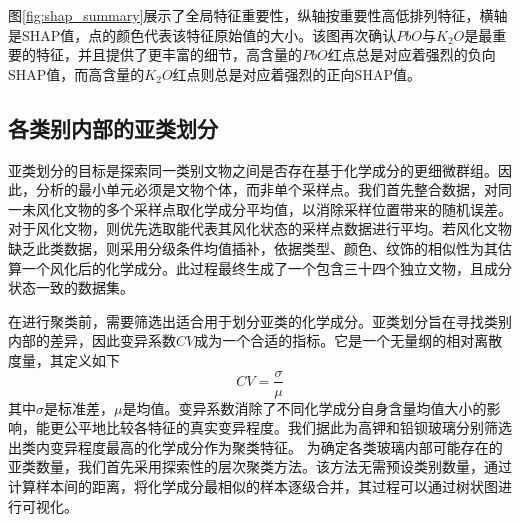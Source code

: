 图\ref{fig:shap_summary}展示了全局特征重要性，纵轴按重要性高低排列特征，横轴是SHAP值，点的颜色代表该特征原始值的大小。该图再次确认$PbO$与$K_2O$是最重要的特征，并且提供了更丰富的细节，高含量的$PbO$红点总是对应着强烈的负向SHAP值，而高含量的$K_2O$红点则总是对应着强烈的正向SHAP值。

\subsection{各类别内部的亚类划分}

亚类划分的目标是探索同一类别文物之间是否存在基于化学成分的更细微群组。因此，分析的最小单元必须是文物个体，而非单个采样点。我们首先整合数据，对同一未风化文物的多个采样点取化学成分平均值，以消除采样位置带来的随机误差。对于风化文物，则优先选取能代表其风化状态的采样点数据进行平均。若风化文物缺乏此类数据，则采用分级条件均值插补，依据类型、颜色、纹饰的相似性为其估算一个风化后的化学成分。此过程最终生成了一个包含三十四个独立文物，且成分状态一致的数据集。

在进行聚类前，需要筛选出适合用于划分亚类的化学成分。亚类划分旨在寻找类别内部的差异，因此变异系数$CV$成为一个合适的指标。它是一个无量纲的相对离散度量，其定义如下
\begin{equation}
    CV = \frac{\sigma}{\mu}
\end{equation}
其中$\sigma$是标准差，$\mu$是均值。变异系数消除了不同化学成分自身含量均值大小的影响，能更公平地比较各特征的真实变异程度。我们据此为高钾和铅钡玻璃分别筛选出类内变异程度最高的化学成分作为聚类特征。
为确定各类玻璃内部可能存在的亚类数量，我们首先采用探索性的层次聚类方法。该方法无需预设类别数量，通过计算样本间的距离，将化学成分最相似的样本逐级合并，其过程可以通过树状图进行可视化。

